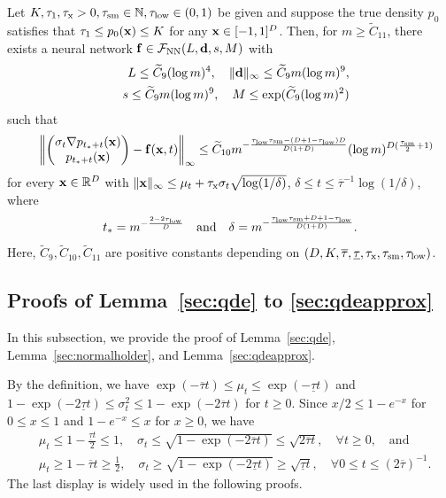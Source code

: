 \documentclass[twoside,11pt]{article}
\def\cF{\mathcal F}
\newcommand{\bd}{{\bf d}}
\newcommand{\bff}{{\bf f}}
\newcommand{\bx}{{\bf x}}
\newcommand{\bbR}{{\mathbb R}}
\newcommand{\bbN}{{\mathbb N}}
\newcommand{\be}{\begin{equation}}
\newcommand{\ee}{\end{equation}}
\newcommand{\bean}{\setlength\arraycolsep{1pt}\begin{eqnarray*}}
\newcommand{\eean}{\end{eqnarray*}}
\begin{document}
\begin{proposition}
\label{secpt:3}
Let $K, \tau_1, \tau_{\rm x} > 0, \tau_{\rm sm} \in \bbN, \tau_{\rm low} \in (0,1)$ be given and suppose the true density $p_0$ satisfies that $\tau_1 \leq p_0(\bx) \leq K$ for any $\bx \in [-1,1]^{D}$.   
Then, for $m \geq \widetilde C_{11}$, there exists a neural network $\bff \in \cF_{\rm NN}(L,\bd,s,M)$ with
\bean
&& L \leq \widetilde C_{9} ( \log m )^{4} , \quad \| \bd\|_{\infty} \leq \widetilde C_{9} m (\log m)^{9},
\\
&& s \leq \widetilde C_{9}  m (\log m)^{9}, \quad M \leq \exp(\widetilde C_{9} (\log m)^2 )
\eean
such that
\bean
&& \left\| \begin{pmatrix}
\sigma_t \nabla p_{t_*+t}(\bx) 
\\
 p_{t_*+t}(\bx)
\end{pmatrix}
-  \bff(\bx,t) \right\|_{\infty} \leq \widetilde C_{10} m^{ - \frac{ \tau_{\rm low} \tau_{\rm sm} - ( D + 1 - \tau_{\rm low} ) D  }{D ( 1 + D  )}}   
 (\log m)^{D(\frac{\tau_{\rm sm}}{2} + 1)}
\eean
for every $\bx \in \bbR^{D}$ with $\|\bx\|_{\infty} \leq \mu_t + \tau_{\rm x} \sigma_t \sqrt{\log (1/\delta)}$, $\delta \leq t \leq \overline{\tau}^{-1} \log (1/\delta)$, where
\bean
t_* = m^{-\frac{ 2-2\tau_{\rm low} }{D} } 
\quad \text{and} \quad \delta = m^{- \frac{\tau_{\rm low} \tau_{\rm sm} + D + 1 - \tau_{\rm low}  }{D (1 + D  ) }}.
\eean
Here, $\widetilde C_{9}, \widetilde C_{10}, \widetilde C_{11}$ are positive constants depending on $( D, K, \overline{\tau},  \underline{\tau}, \tau_{\rm x},  \tau_{\rm sm}, \tau_{\rm low} )$.
\end{proposition}

\subsection{Proofs of Lemma~\ref{sec:qde} to \ref{sec:qdeapprox}}

In this subsection, we provide the proof of Lemma~\ref{sec:qde}, Lemma~\ref{sec:normalholder}, and Lemma~\ref{sec:qdeapprox}.

By the definition, we have $\exp(-\overline{\tau} t) \leq \mu_t \leq \exp(-\underline{\tau} t)$ and $1-\exp(-2\underline{\tau} t) \leq \sigma_t^2 \leq 1- \exp(-2\overline{\tau} t)$ for $t \geq 0$. Since  $x/2 \leq 1- e^{-x}$ for $0 \leq x \leq 1$ and $1 - e^{-x} \leq x$ for $x \geq 0$, we have
\be
\begin{split}
& \mu_t \leq 1- \frac{\underline{\tau}t}{2} \leq 1,
\quad
\sigma_t \leq \sqrt{ 1 - \exp (-2 \overline{\tau} t ) } \leq  \sqrt{2\overline{\tau}t},
\quad \forall t \geq 0,  
\quad \text{and}
\\
&
\mu_t  \geq 1- \overline{\tau}t \geq \frac{1}{2},
\quad
\sigma_t \geq \sqrt{1 - \exp(-2 \underline{\tau} t) } \geq  \sqrt{\underline{\tau}t },
\quad \forall 0 \leq t \leq (2\overline{\tau})^{-1}.
\label{eqthm:mtstbd}
\end{split}
\ee
The last display is widely used in the following proofs.
\end{document}
